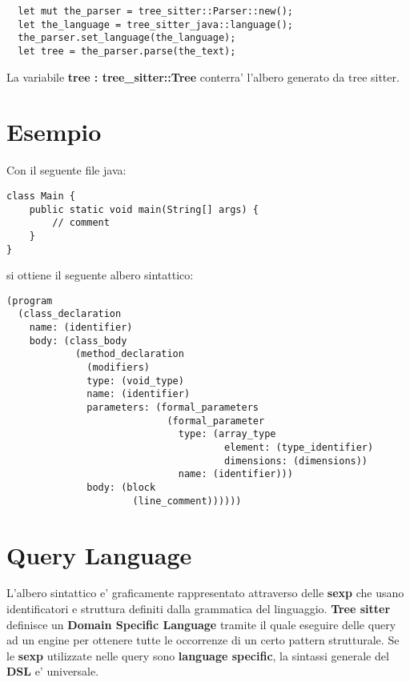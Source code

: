 \begin{verbatim}
  let mut the_parser = tree_sitter::Parser::new();
  let the_language = tree_sitter_java::language();
  the_parser.set_language(the_language);
  let tree = the_parser.parse(the_text);
\end{verbatim}

La variabile \textbf{tree : tree\_sitter::Tree} conterra' l'albero generato da tree sitter.


\section{Esempio}

Con il seguente file java:

\begin{verbatim}
class Main {
	public static void main(String[] args) {
    	// comment
    }
}
\end{verbatim}

si ottiene il seguente albero sintattico:

\begin{verbatim}
(program
  (class_declaration
    name: (identifier)
    body: (class_body
            (method_declaration
              (modifiers)
              type: (void_type)
              name: (identifier)
              parameters: (formal_parameters
                            (formal_parameter
                              type: (array_type
                                      element: (type_identifier)
                                      dimensions: (dimensions))
                              name: (identifier)))
              body: (block
                      (line_comment))))))
\end{verbatim}

\section{Query Language}

L'albero sintattico e' graficamente rappresentato attraverso delle \textbf{sexp} che usano identificatori e struttura definiti dalla grammatica del linguaggio.
\textbf{Tree sitter} definisce un \textbf{Domain Specific Language} tramite il quale eseguire delle query ad un engine per ottenere tutte le occorrenze di un certo pattern strutturale.
Se le \textbf{sexp} utilizzate nelle query sono \textbf{language specific},  la sintassi generale del \textbf{DSL} e' universale.

